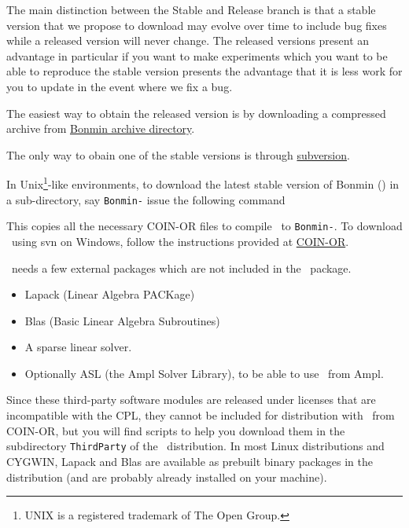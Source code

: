 The main distinction between the Stable and Release branch is that a stable version that we propose to download may evolve over time to include bug fixes while a released version will never change. The released versions present an advantage in particular if you want to make experiments which you want to be able to reproduce the stable version presents the advantage that it is less work for you to update in the event where we fix a bug.

The easiest way to obtain the released version is by downloading a compressed archive from \href{http://www.coin-or.org/Tarballs/Bonmin/}{Bonmin archive directory}.

The only way to obain one of the stable versions is through \href{http://subversion.tigris.org/}{subversion}.

In Unix\footnote{UNIX is a registered trademark of The Open
Group.}-like environments, to download the latest stable version of Bonmin (\stableVersion) in a sub-directory, say {\tt Bonmin-\stableVersion} 
issue the following command
\break

\begin{colorverb}
\end{colorverb}

\noindent This copies all the necessary COIN-OR files to compile \Bonmin\ to
{\tt Bonmin-\stableVersion}. To download \Bonmin\ using svn on Windows,
follow the instructions provided at
\href{http://www.coin-or.org/faqs.html\#q4}{COIN-OR}.

\Bonmin\ needs a few external packages which are not included in the \Bonmin\ package.
\begin{itemize}
\item Lapack (Linear Algebra PACKage)
\item Blas (Basic Linear Algebra Subroutines)
\item A sparse linear solver.
\item Optionally ASL (the Ampl Solver Library), to be able to use \Bonmin\ from Ampl.
\end{itemize}


Since these third-party software modules are released under licenses
that are incompatible with the CPL, they cannot be included for
distribution with \Bonmin\ from COIN-OR, but you will find scripts
to help you download them in the subdirectory {\tt ThirdParty} of
the \Bonmin\ distribution. In most Linux distributions and
CYGWIN, Lapack and Blas are available as prebuilt binary packages in
the distribution (and are probably already installed on your
machine). 

